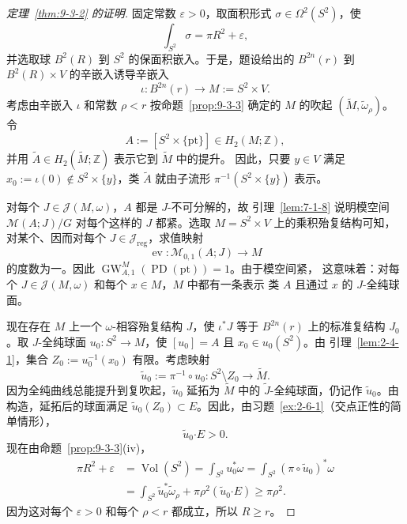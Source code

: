 \begin{proof}[定理~\ref{thm:9-3-2} 的证明]
固定常数 $\varepsilon>0$，取面积形式 $\sigma\in\Omega^2(S^2)$，使
\[
  \int_{S^2}\sigma=\pi R^2+\varepsilon,
\]
并选取球 $B^2(R)$ 到 $S^2$ 的保面积嵌入。于是，题设给出的
$B^{2n}(r)$ 到 $B^2(R)\times V$ 的辛嵌入诱导辛嵌入
\[
  \iota:B^{2n}(r)\longrightarrow M:=S^2\times V.
\]
考虑由辛嵌入 $\iota$ 和常数 $\rho<r$ 按命题~\ref{prop:9-3-3} 确定的
$M$ 的吹起 $(\widetilde M,\widetilde\omega_\rho)$。令
\[
  A:=[S^2\times\{\mathrm{pt}\}]\in H_2(M;\mathbb Z),
\]
并用 $\widetilde A\in H_2(\widetilde M;\mathbb Z)$ 表示它到 $\widetilde M$ 中的提升。
因此，只要 $y\in V$ 满足
$x_0:=\iota(0)\notin S^2\times\{y\}$，类 $\widetilde A$ 就由子流形
$\pi^{-1}(S^2\times\{y\})$ 表示。

对每个 $J\in\mathcal J(M,\omega)$，$A$ 都是 $J$-不可分解的，故
引理~\ref{lem:7-1-8} 说明模空间 $\mathcal M(A;J)/G$ 对每个这样的 $J$ 都紧。选取
$M=S^2\times V$ 上的乘积殆复结构可知，对某个、因而对每个
$J\in\mathcal J_{\mathrm{reg}}$，求值映射
\[
  \operatorname{ev}:\mathcal M_{0,1}(A;J)\longrightarrow M
\]
的度数为一。因此
$\operatorname{GW}^{M}_{A,1}(\operatorname{PD}(\mathrm{pt}))=1$。由于模空间紧，
这意味着：对每个 $J\in\mathcal J(M,\omega)$ 和每个 $x\in M$，$M$ 中都有一条表示
类 $A$ 且通过 $x$ 的 $J$-全纯球面。

现在存在 $M$ 上一个 $\omega$-相容殆复结构 $J$，使 $\iota^*J$ 等于
$B^{2n}(r)$ 上的标准复结构 $J_0$。取 $J$-全纯球面
$u_0:S^2\to M$，使 $[u_0]=A$ 且 $x_0\in u_0(S^2)$。由
引理~\ref{lem:2-4-1}，集合 $Z_0:=u_0^{-1}(x_0)$ 有限。考虑映射
\[
  \widetilde u_0:=\pi^{-1}\circ u_0:
  S^2\setminus Z_0\longrightarrow\widetilde M.
\]
因为全纯曲线总能提升到复吹起，$\widetilde u_0$ 延拓为 $\widetilde M$ 中的
$\widetilde J$-全纯球面，仍记作 $\widetilde u_0$。由构造，延拓后的球面满足
$\widetilde u_0(Z_0)\subset E$。因此，由习题~\ref{ex:2-6-1}（交点正性的简单情形），
\[
  \widetilde u_0\mathbin{\boldsymbol\cdot}E>0.
\]
现在由命题~\ref{prop:9-3-3}(iv)，
\[
\begin{split}
  \pi R^2+\varepsilon
  &=\operatorname{Vol}(S^2)
   =\int_{S^2}u_0^*\omega
   =\int_{S^2}(\pi\circ\widetilde u_0)^*\omega\\
  &=\int_{S^2}\widetilde u_0^*\widetilde\omega_\rho
    +\pi\rho^2(\widetilde u_0\mathbin{\boldsymbol\cdot}E)
  \ge\pi\rho^2.
\end{split}
\]
因为这对每个 $\varepsilon>0$ 和每个 $\rho<r$ 都成立，所以 $R\ge r$。
\end{proof}

